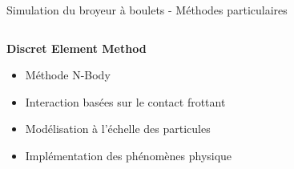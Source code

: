 \documentclass[aspectratio=169]{beamer} %
\begin{document}
\begin{frame}{Simulation du broyeur à boulets - Méthodes particulaires}
    \vspace{-0.6cm}

    \begin{columns}[t]
        \begin{column}{0.5\textwidth}
            \vspace{-0.3cm}
            \begin{center}
                \textbf{Discret Element Method} \\
            \end{center}
            \begin{figure}[b]
            \end{figure}
            \begin{itemize}
                \item Méthode N-Body
                \item Interaction basées sur le contact frottant
                \item Modélisation à l'échelle des particules
                \item Implémentation des phénomènes physique
            \end{itemize}

        \end{column}


\end{columns}
\end{frame}
\end{document}

